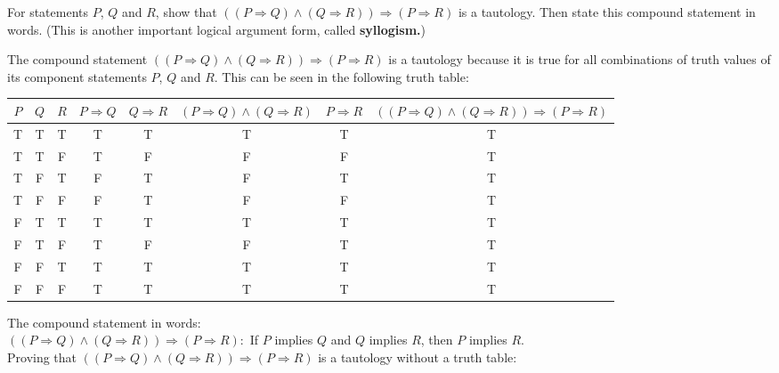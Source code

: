 \documentclass[12pt]{article}
\newenvironment{problem}[2][Problem]{\begin{trivlist}
		\item[\hskip \labelsep {\bfseries #1}\hskip \labelsep {\bfseries #2.}]}{\end{trivlist}}
\newenvironment{solution}[2][Solution]{\begin{trivlist}
		\item[\hskip \labelsep {\bfseries #1}\hskip \labelsep {\bfseries #2.}]}{\end{trivlist}}
\begin{document}
\begin{problem}{49}
	For statements $P$, $Q$ and $R$, show that $((P \Rightarrow Q)\wedge (Q \Rightarrow R)) \Rightarrow (P \Rightarrow R)$ is a tautology. Then state this compound statement in words. (This is another important logical argument form, called \textbf{syllogism.})
	
	\begin{solution}{}
		The compound statement $((P \Rightarrow Q)\wedge (Q \Rightarrow R)) \Rightarrow (P \Rightarrow R)$ is a tautology because it is true for all combinations of truth values of its component statements $P$, $Q$ and $R$. This can be seen in the following truth table:
		
	\begin{center}
		\begin{tabular}{|c |c |c |c |c |c |c |c|}
			
			$P$ & $Q$ & $R$ & $P \Rightarrow Q$ & $Q \Rightarrow R$ & $(P \Rightarrow Q) \wedge (Q \Rightarrow R)$ & $P \Rightarrow R$ & $((P \Rightarrow Q) \wedge (Q \Rightarrow R)) \Rightarrow (P \Rightarrow R)$ \\
			\hline
			T & T & T & T & T & T & T & T\\
			T & T & F & T & F & F & F & T\\
			T & F & T & F & T & F & T & T\\
			T & F & F & F & T & F & F & T\\
			F & T & T & T & T & T & T & T\\
			F & T & F & T & F & F & T & T\\
			F & F & T & T & T & T & T & T\\
			F & F & F & T & T & T & T & T\\
			\hline
		\end{tabular}
	\end{center}
The compound statement in words:\\
$((P \Rightarrow Q) \wedge (Q \Rightarrow R)) \Rightarrow (P \Rightarrow R):$ If $P$ implies $Q$ and $Q$ implies $R$, then $P$ implies $R$.\\

\noindent Proving that $((P \Rightarrow Q) \wedge (Q \Rightarrow R)) \Rightarrow (P \Rightarrow R)$ is a tautology without a truth table:\\


\end{solution}
\end{problem}
\end{document}
